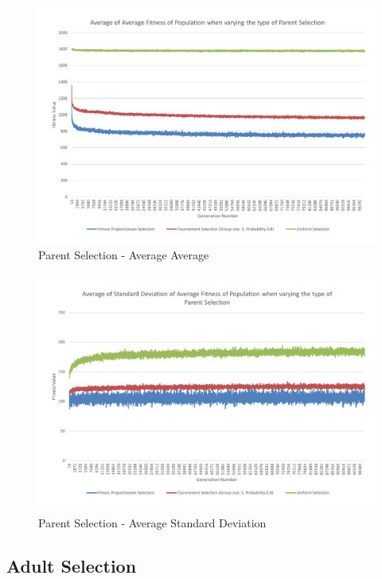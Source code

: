 \begin{figure}[thbp]
	\centerline{\includegraphics[width=\paperwidth]{figures/CircleTests/CircleTestParentSelectionAverageAverage.pdf}}
	\caption{Parent Selection - Average Average}
\end{figure}

\begin{figure}[thbp]
	\centerline{\includegraphics[width=\paperwidth]{figures/CircleTests/CircleTestParentSelectionAverageStandardDeviation.pdf}}
	\caption{Parent Selection - Average Standard Deviation}
\end{figure}

\clearpage

\subsection{Adult Selection} %
\label{sub:adult_selection}

